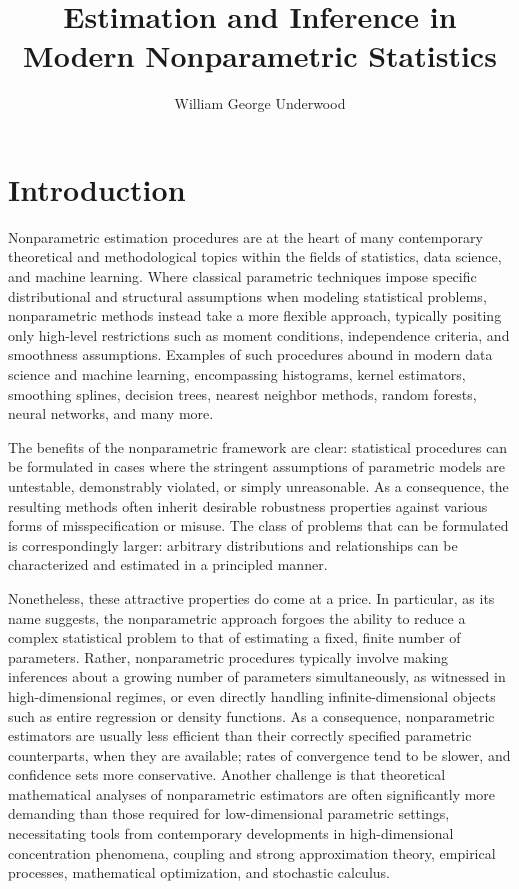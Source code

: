 \documentclass[11pt,lof]{puthesis}
\author{William George Underwood}
\title{Estimation and Inference in \\ Modern Nonparametric Statistics}
\theoremstyle{break}
\theoremstyle{proof}
\begin{document}
\chapter{Introduction}

Nonparametric estimation procedures are at the heart of many contemporary
theoretical and methodological topics within the fields of statistics, data
science, and machine learning. Where classical parametric techniques impose
specific distributional and structural assumptions when modeling statistical
problems, nonparametric methods instead take a more flexible approach,
typically positing only high-level restrictions such as moment conditions,
independence criteria, and smoothness assumptions. Examples of such procedures
abound in modern data science and machine learning, encompassing histograms,
kernel estimators, smoothing splines, decision trees, nearest neighbor methods,
random forests, neural networks, and many more.

The benefits of the nonparametric framework are clear: statistical procedures
can be formulated in cases where the stringent assumptions of parametric models
are untestable, demonstrably violated, or simply unreasonable. As a
consequence, the resulting methods often inherit desirable robustness
properties against various forms of misspecification or misuse. The class of
problems that can be formulated is correspondingly larger: arbitrary
distributions and relationships can be characterized and estimated in a
principled manner.

Nonetheless, these attractive properties do come at a price. In particular, as
its name suggests, the nonparametric approach forgoes the ability to reduce a
complex statistical problem to that of estimating a fixed, finite number of
parameters. Rather, nonparametric procedures typically involve making
inferences about a growing number of parameters simultaneously, as witnessed in
high-dimensional regimes, or even directly handling infinite-dimensional
objects such as entire regression or density functions. As a consequence,
nonparametric estimators are usually less efficient than their correctly
specified parametric counterparts, when they are available; rates of
convergence tend to be slower, and confidence sets more conservative. Another
challenge is that theoretical mathematical analyses of nonparametric estimators
are often significantly more demanding than those required for low-dimensional
parametric settings, necessitating tools from contemporary developments in
high-dimensional concentration phenomena, coupling and strong approximation
theory, empirical processes, mathematical optimization, and stochastic
calculus.
\end{document}
